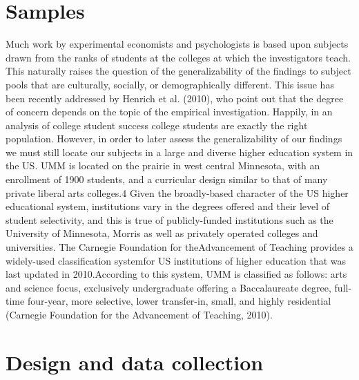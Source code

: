 \documentclass[12pt,a4paper]{article}
\begin{document}
\section{Samples}

Much work by experimental economists and psychologists is based upon subjects drawn from the ranks of students at the colleges at which the investigators teach. This naturally raises the question of the generalizability of the findings to subject pools that are culturally, socially, or demographically different. This issue has been recently addressed by Henrich et al. (2010), who point out that the degree of concern depends on the topic of the empirical investigation. Happily, in an
analysis of college student success college students are exactly the right population. However, in order to later assess the generalizability of our findings we must still locate our subjects in a large and diverse higher education system in the US.
UMM is located on the prairie in west central Minnesota, with an enrollment of 1900 students, and a curricular design
similar to that of many private liberal arts colleges.4 Given the broadly-based character of the US higher educational system,
institutions vary in the degrees offered and their level of student selectivity, and this is true of publicly-funded institutions
such as the University of Minnesota, Morris as well as privately operated colleges and universities. The Carnegie Foundation
for theAdvancement of Teaching provides a widely-used classification systemfor US institutions of higher education that was
last updated in 2010.According to this system, UMM is classified as follows: arts and science focus, exclusively undergraduate
offering a Baccalaureate degree, full-time four-year, more selective, lower transfer-in, small, and highly residential (Carnegie
Foundation for the Advancement of Teaching, 2010). 

\section{Design and data collection}
\end{document}
